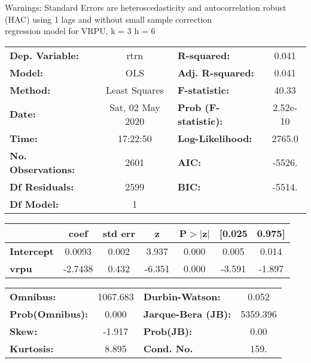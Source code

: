 Warnings: \newline
 [1] Standard Errors are heteroscedasticity and autocorrelation robust (HAC) using 1 lags and without small sample correction\\ 

regression model for VRPU, k = 3 h = 6\begin{center}
\begin{tabular}{lclc}
\toprule
\textbf{Dep. Variable:}    &       rtrn       & \textbf{  R-squared:         } &     0.041   \\
\textbf{Model:}            &       OLS        & \textbf{  Adj. R-squared:    } &     0.041   \\
\textbf{Method:}           &  Least Squares   & \textbf{  F-statistic:       } &     40.33   \\
\textbf{Date:}             & Sat, 02 May 2020 & \textbf{  Prob (F-statistic):} &  2.52e-10   \\
\textbf{Time:}             &     17:22:50     & \textbf{  Log-Likelihood:    } &    2765.0   \\
\textbf{No. Observations:} &        2601      & \textbf{  AIC:               } &    -5526.   \\
\textbf{Df Residuals:}     &        2599      & \textbf{  BIC:               } &    -5514.   \\
\textbf{Df Model:}         &           1      & \textbf{                     } &             \\
\bottomrule
\end{tabular}
\begin{tabular}{lcccccc}
                   & \textbf{coef} & \textbf{std err} & \textbf{z} & \textbf{P$> |$z$|$} & \textbf{[0.025} & \textbf{0.975]}  \\
\midrule
\textbf{Intercept} &       0.0093  &        0.002     &     3.937  &         0.000        &        0.005    &        0.014     \\
\textbf{vrpu}      &      -2.7438  &        0.432     &    -6.351  &         0.000        &       -3.591    &       -1.897     \\
\bottomrule
\end{tabular}
\begin{tabular}{lclc}
\textbf{Omnibus:}       & 1067.683 & \textbf{  Durbin-Watson:     } &    0.052  \\
\textbf{Prob(Omnibus):} &   0.000  & \textbf{  Jarque-Bera (JB):  } & 5359.396  \\
\textbf{Skew:}          &  -1.917  & \textbf{  Prob(JB):          } &     0.00  \\
\textbf{Kurtosis:}      &   8.895  & \textbf{  Cond. No.          } &     159.  \\
\bottomrule
\end{tabular}
\end{center}

